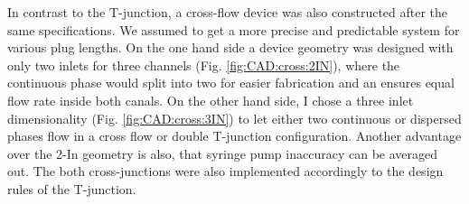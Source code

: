 In contrast to the T-junction, a cross-flow device was also constructed after the same specifications. We assumed to get a more precise and predictable system for various plug lengths.  On the one hand side a device geometry was designed with only two inlets for three channels (Fig. \ref{fig:CAD:cross:2IN}), where the continuous phase would split into two for easier fabrication and an ensures equal flow rate inside both canals. On the other hand side, I chose a three inlet dimensionality (Fig. \ref{fig:CAD:cross:3IN}) to let either two continuous or dispersed phases flow in a cross flow or double T-junction configuration. Another advantage over the 2-In geometry is also, that syringe pump inaccuracy can be averaged out. The both cross-junctions were also implemented accordingly to the design rules of the T-junction.

